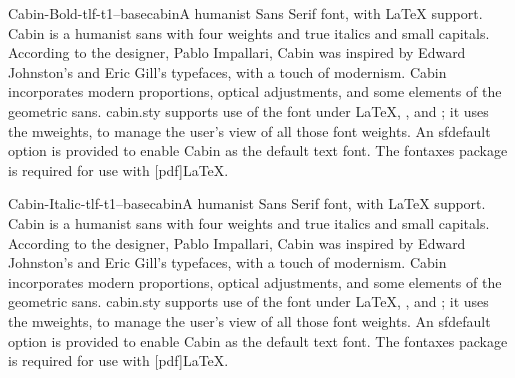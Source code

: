 \documentclass{ddltxtyp}
\begin{document}
\begin{package}{Cabin-Bold-tlf-t1--base}{cabin}{A humanist Sans Serif font, with {\LaTeX} support.}
Cabin is a humanist sans with four weights and true italics and
small capitals. According to the designer, Pablo Impallari,
Cabin was inspired by Edward Johnston's and Eric Gill's
typefaces, with a touch of modernism. Cabin incorporates modern
proportions, optical adjustments, and some elements of the
geometric sans. cabin.sty supports use of the font under {\LaTeX},
{\pdfLaTeX}, {\XeLaTeX} and {\LuaLaTeX}; it uses the mweights, to manage
the user's view of all those font weights. An sfdefault option
is provided to enable Cabin as the default text font. The
fontaxes package is required for use with [pdf]{\LaTeX}.
\end{package}
\begin{package}{Cabin-Italic-tlf-t1--base}{cabin}{A humanist Sans Serif font, with {\LaTeX} support.}
Cabin is a humanist sans with four weights and true italics and
small capitals. According to the designer, Pablo Impallari,
Cabin was inspired by Edward Johnston's and Eric Gill's
typefaces, with a touch of modernism. Cabin incorporates modern
proportions, optical adjustments, and some elements of the
geometric sans. cabin.sty supports use of the font under {\LaTeX},
{\pdfLaTeX}, {\XeLaTeX} and {\LuaLaTeX}; it uses the mweights, to manage
the user's view of all those font weights. An sfdefault option
is provided to enable Cabin as the default text font. The
fontaxes package is required for use with [pdf]{\LaTeX}.
\end{package}
\end{document}
